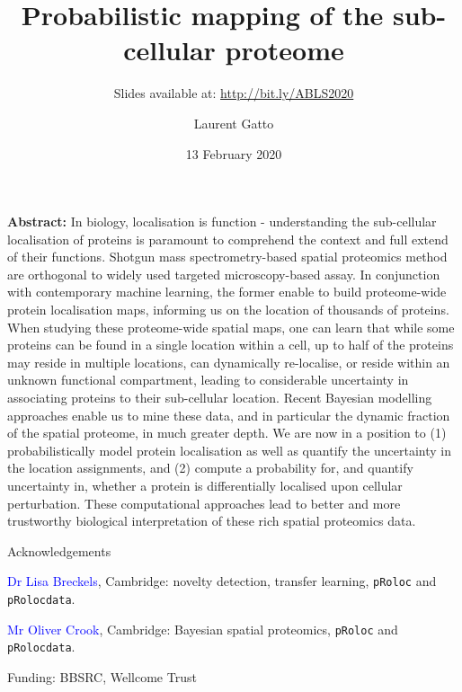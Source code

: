 \documentclass{beamer}
\title{Probabilistic mapping  of the sub-cellular proteome}
\author[]{Laurent Gatto}
\date{13 February 2020}
\institute[]{CBIO, de Duve Institute, UCLouvain}
\subtitle{Slides available at: \url{http://bit.ly/ABLS2020}}
\theoremstyle{example}
\begin{document}



\begin{frame}[plain]
\titlepage
\end{frame}


\begin{frame}%


\justify

{\small \textbf{Abstract:} In biology, localisation is function -
  understanding the sub-cellular localisation of proteins is paramount
  to comprehend the context and full extend of their
  functions. Shotgun mass spectrometry-based spatial proteomics method
  are orthogonal to widely used targeted microscopy-based assay. In
  conjunction with contemporary machine learning, the former enable to
  build proteome-wide protein localisation maps, informing us on the
  location of thousands of proteins. When studying these proteome-wide
  spatial maps, one can learn that while some proteins can be found in
  a single location within a cell, up to half of the proteins may
  reside in multiple locations, can dynamically re-localise, or reside
  within an unknown functional compartment, leading to considerable
  uncertainty in associating proteins to their sub-cellular
  location. Recent Bayesian modelling approaches enable us to mine
  these data, and in particular the dynamic fraction of the spatial
  proteome, in much greater depth. We are now in a position to (1)
  probabilistically model protein localisation as well as quantify the
  uncertainty in the location assignments, and (2) compute a
  probability for, and quantify uncertainty in, whether a protein is
  differentially localised upon cellular perturbation. These
  computational approaches lead to better and more trustworthy
  biological interpretation of these rich spatial proteomics data.  }


\end{frame}


\begin{frame}{Acknowledgements}


\textcolor{Blue}{Dr Lisa Breckels}, Cambridge: novelty detection,
transfer learning, \texttt{pRoloc} and \texttt{pRolocdata}.

\bigskip

\textcolor{Blue}{Mr Oliver Crook}, Cambridge: Bayesian spatial
proteomics, \texttt{pRoloc} and \texttt{pRolocdata}.

\bigskip

Funding: BBSRC, Wellcome Trust

\end{frame}
\end{document}
